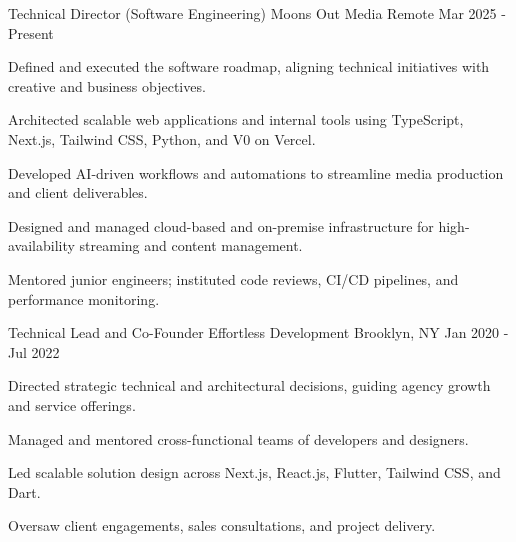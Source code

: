 
\begin{cventries}

  \cventry
    {Technical Director (Software Engineering)} %
    {Moons Out Media} %
    {Remote} %
    {Mar 2025 - Present} %
    {
      \begin{cvitems}
        \item {Defined and executed the software roadmap, aligning technical initiatives with creative and business objectives.}
        \item {Architected scalable web applications and internal tools using TypeScript, Next.js, Tailwind CSS, Python, and V0 on Vercel.}
        \item {Developed AI-driven workflows and automations to streamline media production and client deliverables.}
        \item {Designed and managed cloud-based and on-premise infrastructure for high-availability streaming and content management.}
        \item {Mentored junior engineers; instituted code reviews, CI/CD pipelines, and performance monitoring.}
      \end{cvitems}
    }


  \cventry
    {Technical Lead and Co-Founder} %
    {Effortless Development} %
    {Brooklyn, NY} %
    {Jan 2020 - Jul 2022} %
    {
      \begin{cvitems}
        \item {Directed strategic technical and architectural decisions, guiding agency growth and service offerings.}
        \item {Managed and mentored cross-functional teams of developers and designers.}
        \item {Led scalable solution design across Next.js, React.js, Flutter, Tailwind CSS, and Dart.}
        \item {Oversaw client engagements, sales consultations, and project delivery.}
      \end{cvitems}
    }


\end{cventries}
